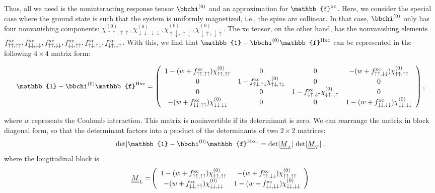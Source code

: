 \documentclass[aps,prb,twocolumn,superscriptaddress]{revtex4-2}
\newcommand{\ud}{{\uparrow\downarrow}}
\newcommand{\du}{{\downarrow\uparrow}}
\newcommand{\uu}{{\uparrow\uparrow}}
\newcommand{\dd}{{\downarrow\downarrow}}
\newcommand{\ua}{\uparrow}
\newcommand{\da}{\downarrow}
\begin{document}
Thus, all we need is the noninteracting response tensor $\mathbb{\bbchi}^{(0)}$ and an approximation for $\mathbb{f}^{\rm xc}$.
Here, we consider the special case where the ground state is such that the system is uniformly magnetized, i.e., the spins are collinear.
In that case, $\mathbb{\bbchi}^{(0)}$ only has four nonvanishing components: $\chi_{\uu,\uu}^{(0)}, \chi_{\dd,\dd}^{(0)}, \chi_{\ud,\ud}^{(0)},\chi_{\du,\du}^{(0)}$.
The xc tensor, on the other hand, has the nonvanishing elements
$f^{\rm xc}_{\uu,\uu} , f^{\rm xc}_{\dd,\dd} , f^{\rm xc}_{\uu,\dd} , f^{\rm xc}_{\dd,\uu} , f^{\rm xc}_{\ud,\ud} , f^{\rm xc}_{\du,\du}$. With this, we find that
$\mathbb{1} - \mathbb{\bbchi}^{(0)} \mathbb{f}^{\rm Hxc}$ can be represented in the following $4\times 4$ matrix form:
\begin{widetext}
\begin{equation} \label{InteractingResponseSpin}
\mathbb{1} - \mathbb{\bbchi}^{(0)} \mathbb{f}^{\rm Hxc}=\left( \begin{array}{cccc}
1-(w+f_{\ua\ua,\ua\ua}^{\rm xc})\chi_{\ua\ua,\ua\ua}^{(0)} & 0 & 0 & -(w +f_{\ua\ua,\da\da}^{\rm xc})\chi_{\ua\ua,\ua\ua}^{(0)}\\
0 & 1-f_{\ua\da,\ua\da}^{\rm xc}\chi_{\ua\da,\ua\da}^{(0)} & 0 & 0 \\
0 & 0 & 1-f_{\da\ua,\da\ua}^{\rm xc}\chi_{\da\ua,\da\ua}^{(0)} &  0\\
-(w+f_{\da\da,\ua\ua}^{\rm xc})\chi_{\da\da,\da\da}^{(0)} & 0 &0  & 1-(w+f_{\da\da,\da\da}^{\rm xc})\chi_{\da\da,\da\da}^{(0)}\\
  \end{array}\right),
\end{equation}
\end{widetext}
where $w$ represents the Coulomb interaction. This matrix is noninvertible if its determinant is zero.
We can rearrange the matrix in block diagonal form, so that the determinant factors into a product of the determinants of two $2\times 2$ matrices:
\begin{equation}
\mbox{det}|\mathbb{1} - \mathbb{\bbchi}^{(0)} \mathbb{f}^{\rm Hxc}| = \mbox{det}|\underline{\underline{M}}_L| \; \mbox{det}|\underline{\underline{M}}_T| \:,
\end{equation}
where the longitudinal block is
\begin{equation}
\underline{\underline{M}}_L = \! \left( \begin{array}{cc} 1-(w+f_{\ua\ua,\ua\ua}^{\rm xc})\chi_{\ua\ua,\ua\ua}^{(0)} & -(w +f_{\ua\ua,\da\da}^{\rm xc})\chi_{\ua\ua,\ua\ua}^{(0)}\\
-(w+f_{\da\da,\ua\ua}^{\rm xc})\chi_{\da\da,\da\da}^{(0)}  & 1-(w+f_{\da\da,\da\da}^{\rm xc})\chi_{\da\da,\da\da}^{(0)}\end{array}\right)
\label{eq:MLongitudinal}
\end{equation}
\end{document}
